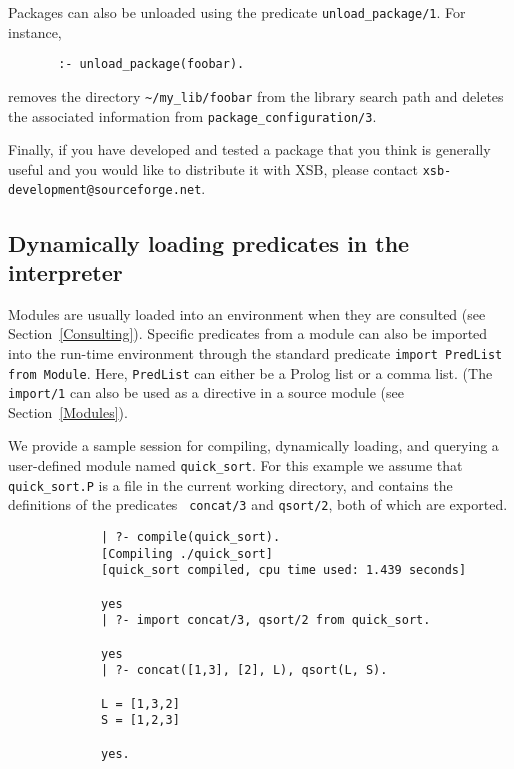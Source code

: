 Packages can also be unloaded using the predicate
\verb|unload_package/1|. For instance, 

\begin{verbatim}
       :- unload_package(foobar).  
\end{verbatim}
removes the directory \verb|~/my_lib/foobar| from the library search path
and deletes the associated information from \verb|package_configuration/3|.

Finally, if you have developed and tested a package that you think is
generally useful and you would like to distribute it with XSB, please
contact {\tt xsb-development@sourceforge.net}.


\subsection{Dynamically loading predicates in the interpreter}
Modules are usually loaded into an environment when they are consulted
(see Section~\ref{Consulting}).  Specific predicates from a module can
also be imported into the run-time environment through the standard
predicate {\tt import PredList from Module}.
Here, {\tt PredList} can either be a Prolog list or a comma list.
(The {\tt import/1} can also be used as a directive in a source module
(see Section~\ref{Modules}). 

We provide a sample session for compiling, dynamically loading, and
querying a user-defined module named {\tt quick\_sort}.  For this
example we assume that {\tt quick\_sort.P} is a file in the current
working directory, and contains the definitions of the predicates {\tt
concat/3} and {\tt qsort/2}, both of which are exported.

{\footnotesize
\begin{verbatim}
             | ?- compile(quick_sort).
             [Compiling ./quick_sort]
             [quick_sort compiled, cpu time used: 1.439 seconds]

             yes
             | ?- import concat/3, qsort/2 from quick_sort. 

             yes
             | ?- concat([1,3], [2], L), qsort(L, S).

             L = [1,3,2]
             S = [1,2,3]

             yes.
\end{verbatim}
}

